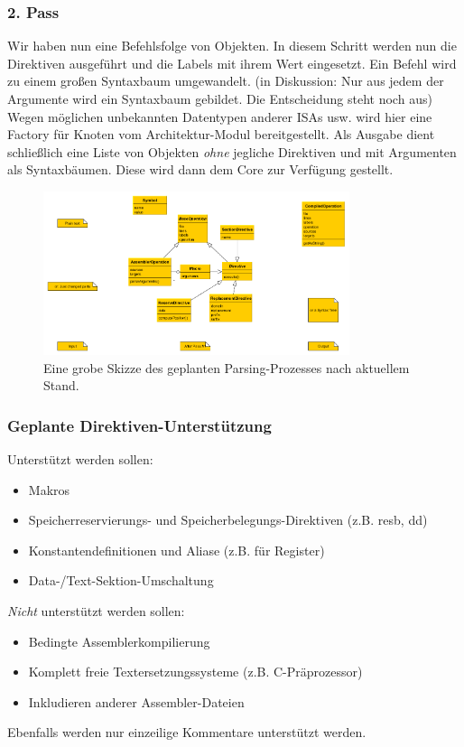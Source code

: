 \documentclass[a4paper]{article}
\begin{document}
\subsubsection{2. Pass}
Wir haben nun eine Befehlsfolge von Objekten. In diesem Schritt werden nun die Direktiven ausgeführt und die Labels mit ihrem Wert eingesetzt.
Ein Befehl wird zu einem großen Syntaxbaum umgewandelt. (in Diskussion: Nur aus jedem der Argumente wird ein Syntaxbaum gebildet. Die Entscheidung steht noch aus)
Wegen möglichen unbekannten Datentypen anderer ISAs usw. wird hier eine Factory für Knoten vom Architektur-Modul bereitgestellt.
Als Ausgabe dient schließlich eine Liste von Objekten \emph{ohne} jegliche Direktiven und mit Argumenten als Syntaxbäumen. Diese wird dann dem Core zur Verfügung gestellt.
\begin{figure}
\centering
\includegraphics[width=0.8\textwidth]{process.png}
\caption{Eine grobe Skizze des geplanten Parsing-Prozesses nach aktuellem Stand.}
\end{figure}
\subsubsection{Geplante Direktiven-Unterstützung}
Unterstützt werden sollen:
\begin{itemize}
\item Makros
\item Speicherreservierungs- und Speicherbelegungs-Direktiven (z.B. resb, dd)
\item Konstantendefinitionen und Aliase (z.B. für Register)
\item Data-/Text-Sektion-Umschaltung
\end{itemize}
\emph{Nicht} unterstützt werden sollen:
\begin{itemize}
\item Bedingte Assemblerkompilierung
\item Komplett freie Textersetzungssysteme (z.B. C-Präprozessor)
\item Inkludieren anderer Assembler-Dateien
\end{itemize}
Ebenfalls werden nur einzeilige Kommentare unterstützt werden.
\end{document}
